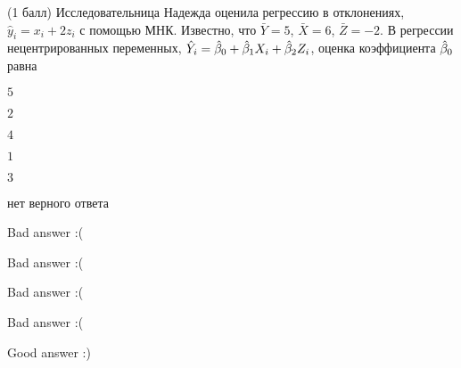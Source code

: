 
\begin{question}
(1 балл) Исследовательница Надежда оценила регрессию в отклонениях,
\(\hat y_i = x_i + 2 z_i\) с помощью МНК. Известно, что \(\bar Y=5\),
\(\bar X =6\), \(\bar Z=-2\). В регрессии нецентрированных переменных,
\(\hat Y_i = \hat{\beta}_0 + \hat{\beta}_1 X_i + \hat{\beta}_2 Z_i\), оценка коэффициента
\(\hat{\beta}_0\) равна
\begin{answerlist}
  \item \(5\)
  \item \(2\)
  \item \(4\)
  \item \(1\)
  \item \(3\)
  \item нет верного ответа
\end{answerlist}
\end{question}

\begin{solution}
\begin{answerlist}
  \item Bad answer :(
  \item Bad answer :(
  \item Bad answer :(
  \item Bad answer :(
  \item Good answer :)
\end{answerlist}
\end{solution}
